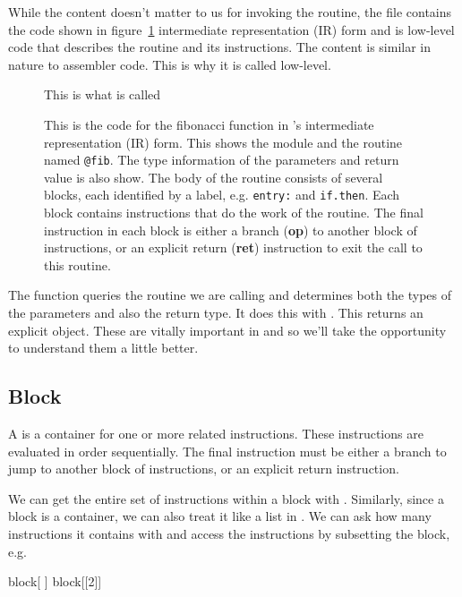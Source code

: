 \documentclass[article]{jss}
\def\Ins#1{\textbf{#1}}
\begin{document}
While the content doesn't matter to us for invoking the routine, the
 file contains the code shown in figure~\ref{fig:IRCodeDisplay}
intermediate representation (IR) form and is low-level code that
describes the routine and its instructions.  The content is similar in
nature to assembler code. This is why it is called low-level.
\begin{figure}
 This is what is called  
  \caption{This is the code for the fibonacci function
in \llvm's intermediate representation (IR) form.
This shows the module and the routine named \texttt{@fib}.
The type information of the parameters and return value is also show.
The body of the routine consists of several blocks, each identified
by a label, e.g. \texttt{entry:} and \texttt{if.then}.
Each block contains instructions that do the work of the routine.
The final instruction in each block is either a branch (\Ins{op})
to another block of instructions, or an explicit return (\Ins{ret})
instruction to exit the call to this routine.
}\label{fig:IRCodeDisplay}
\end{figure}

The  function queries the routine we are calling and
determines both the types of the parameters and also the return type.
It does this with .  This returns an explicit
 object. These are vitally important in \llvm{} and
so we'll take the opportunity to understand them a little better.





\subsection{Block}
A  is a container for one or more related instructions.
These instructions are evaluated in order sequentially.  The final
instruction must be either a branch to jump to another block of
instructions, or an explicit return instruction.

We can get the entire set of instructions within  a block
with .
Similarly, since a block is a container, we can also treat it like a list in \R.  We
can ask how many instructions it contains with  and
access the instructions by subsetting the block, e.g.
\begin{RCode}
 block[ ]  
 block[[2]]
\end{RCode}
\end{document}
